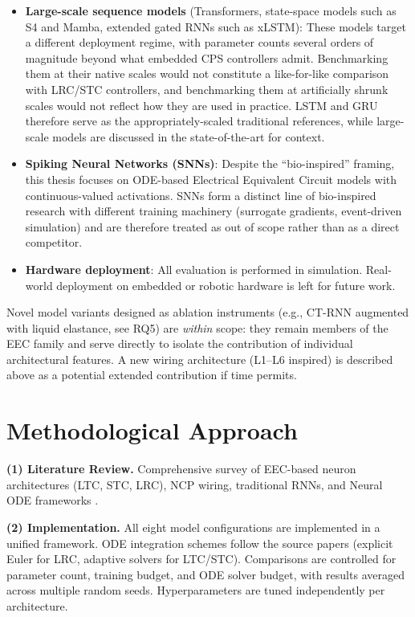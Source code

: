 \documentclass[11pt,a4paper]{article}
\begin{document}
\begin{itemize}
    \item \textbf{Large-scale sequence models} (Transformers, state-space models such as S4 \cite{gu2021efficiently} and Mamba, extended gated RNNs such as xLSTM): These models target a different deployment regime, with parameter counts several orders of magnitude beyond what embedded CPS controllers admit. Benchmarking them at their native scales would not constitute a like-for-like comparison with LRC/STC controllers, and benchmarking them at artificially shrunk scales would not reflect how they are used in practice. LSTM and GRU therefore serve as the appropriately-scaled traditional references, while large-scale models are discussed in the state-of-the-art for context.
    \item \textbf{Spiking Neural Networks (SNNs)}: Despite the ``bio-inspired'' framing, this thesis focuses on ODE-based Electrical Equivalent Circuit models with continuous-valued activations. SNNs form a distinct line of bio-inspired research with different training machinery (surrogate gradients, event-driven simulation) and are therefore treated as out of scope rather than as a direct competitor.
    \item \textbf{Hardware deployment}: All evaluation is performed in simulation. Real-world deployment on embedded or robotic hardware is left for future work.
\end{itemize}

Novel model variants designed as ablation instruments (e.g., CT-RNN augmented with liquid elastance, see RQ5) are \textit{within} scope: they remain members of the EEC family and serve directly to isolate the contribution of individual architectural features. A new wiring architecture (L1--L6 inspired) is described above as a potential extended contribution if time permits.

\newpage
\section{Methodological Approach}

\textbf{(1) Literature Review.}
Comprehensive survey of EEC-based neuron architectures (LTC, STC, LRC), NCP wiring, traditional RNNs, and Neural ODE frameworks \cite{neuralode}.

\textbf{(2) Implementation.}
All eight model configurations are implemented in a unified framework. ODE integration schemes follow the source papers (explicit Euler for LRC, adaptive solvers for LTC/STC). Comparisons are controlled for parameter count, training budget, and ODE solver budget, with results averaged across multiple random seeds. Hyperparameters are tuned independently per architecture.
\end{document}

